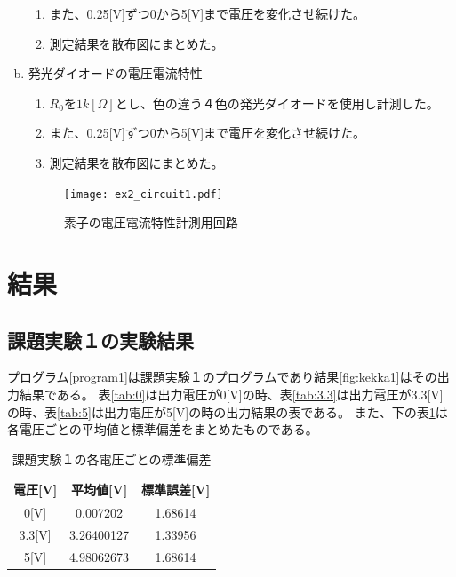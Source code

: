 \documentclass[11pt,dvipdfmx]{jarticle}
\begin{document}
\begin{enumerate}[a.]
\begin{enumerate}[1.]
					\item また、0.25[V]ずつ0から5[V]まで電圧を変化させ続けた。
					\item 測定結果を散布図にまとめた。 
				\end{enumerate}
			\item 発光ダイオードの電圧電流特性 
				\begin{enumerate}[1.]
					\item $R_0を1k[\Omega]$とし、色の違う４色の発光ダイオードを使用し計測した。
					\item また、0.25[V]ずつ0から5[V]まで電圧を変化させ続けた。
					\item 測定結果を散布図にまとめた。 
				\end{enumerate}

				\begin{figure}[h]
					\centering
					\texttt{[image: ex2\_circuit1.pdf]}
					\caption{素子の電圧電流特性計測用回路}
					\label{fig:circuit3}
				\end{figure}
		\end{enumerate}
		





\section{結果}
	\subsection{課題実験１の実験結果}
		プログラム\ref{program1}は課題実験１のプログラムであり結果\ref{fig:kekka1}はその出力結果である。
		表\ref{tab:0}は出力電圧が0[V]の時、表\ref{tab:3.3}は出力電圧が3.3[V]の時、表\ref{tab:5}は出力電圧が5[V]の時の出力結果の表である。
		また、下の表\ref{tab:hensa}は各電圧ごとの平均値と標準偏差をまとめたものである。
		
				

		\begin{table}[H]
			\caption{課題実験１の各電圧ごとの標準偏差}
			\centering
			\label{tab:hensa}
			\begin{tabular}{|c|c|c|}
				\hline
				電圧[V]	&	平均値[V]	&	標準誤差[V]\\
				\hline \hline
				0[V]		&0.007202&	1.68614\\
				\hline
				3.3[V]	&3.26400127&	1.33956\\
				\hline
				5[V]		&4.98062673&	1.68614\\
				\hline
			\end{tabular}
		\end{table}
\end{document}
